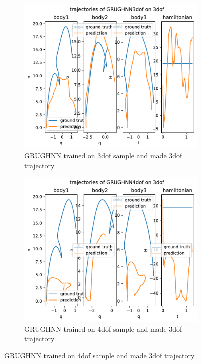 \begin{figure}[htbp]
	\centering
	\begin{subfigure}[b]{0.45\textwidth}
		\centering
		\includegraphics[width=\textwidth]{chapters/chapter5/traj_3dof3_pend.pdf} %
		\caption{GRUGHNN trained on 3dof sample and made 3dof trajectory}
		\label{fig:sub1}
	\end{subfigure}
	\hfill
	\begin{subfigure}[b]{0.45\textwidth}
		\centering
		\includegraphics[width=\textwidth]{chapters/chapter5/traj_4dof3_pend.pdf} %
		\caption{GRUGHNN trained on 4dof sample and made 3dof trajectory}
		\label{fig:sub2}
	\end{subfigure}
	

\end{figure}
